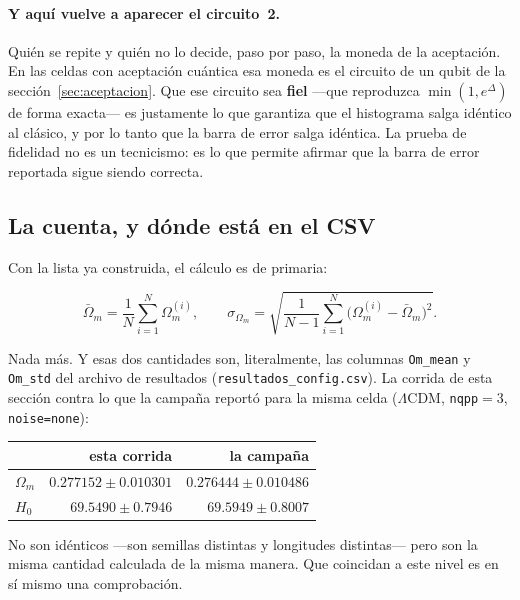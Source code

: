 \documentclass[11pt,a4paper]{article}
\newcommand{\Fi}[1]{\textcolor{fiel}{\textbf{#1}}}
\begin{document}
\paragraph{Y aquí vuelve a aparecer el circuito~2.} Quién se repite y quién no
lo decide, paso por paso, la moneda de la aceptación. En las celdas con
aceptación cuántica esa moneda es el circuito de un qubit de la
sección~\ref{sec:aceptacion}. Que ese circuito sea \Fi{fiel} ---que reproduzca
$\min(1, e^{\Delta})$ de forma exacta--- es justamente lo que garantiza que el
histograma salga idéntico al clásico, y por lo tanto que la barra de error
salga idéntica. La prueba de fidelidad no es un tecnicismo: es lo que permite
afirmar que la barra de error reportada sigue siendo correcta.

\subsection{La cuenta, y dónde está en el CSV}

Con la lista ya construida, el cálculo es de primaria:

\begin{equation}
  \bar{\Omega}_m = \frac{1}{N}\sum_{i=1}^{N} \Omega_m^{(i)},
  \qquad
  \sigma_{\Omega_m} = \sqrt{\frac{1}{N-1}\sum_{i=1}^{N}
    \bigl(\Omega_m^{(i)} - \bar{\Omega}_m\bigr)^2}.
\end{equation}

\noindent
Nada más. Y esas dos cantidades son, literalmente, las columnas
\texttt{Om\_mean} y \texttt{Om\_std} del archivo de resultados
(\texttt{resultados\_config.csv}). La corrida de esta sección contra lo que la
campaña reportó para la misma celda ($\Lambda$CDM, \texttt{nqpp}$=3$,
\texttt{noise=none}):

\begin{center}
\small
\begin{tabular}{lrr}
\toprule
& esta corrida & la campaña \\
\midrule
$\Omega_m$ & $0.277152 \pm 0.010301$ & $0.276444 \pm 0.010486$ \\
$H_0$      & $69.5490 \pm 0.7946$    & $69.5949 \pm 0.8007$ \\
\bottomrule
\end{tabular}
\end{center}

\noindent
No son idénticos ---son semillas distintas y longitudes distintas--- pero son
la misma cantidad calculada de la misma manera. Que coincidan a este nivel es
en sí mismo una comprobación.
\end{document}
